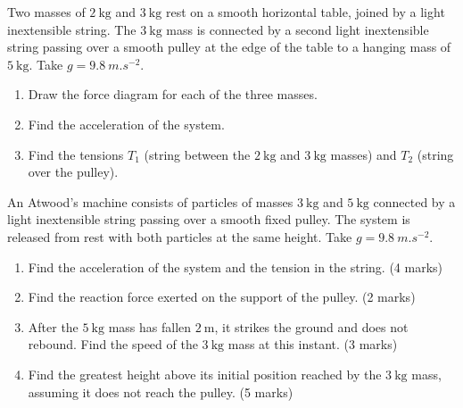 \documentclass[11pt]{article}
\newcounter{popsec}
\newcounter{popsub}
\newcommand{\courssub}[1]{%
  \stepcounter{popsub}%
  \par\vspace{9pt}\noindent{\popxbold\fontsize{11.5}{13}\selectfont\color{popink}{\color{poporange}\thepopsec.\thepopsub}\hspace{6pt}#1}\par\nopagebreak\vspace{4pt}
}
\begin{document}
\begin{exercice}
Two masses of $2\ \mathrm{kg}$ and $3\ \mathrm{kg}$ rest on a smooth horizontal table, joined by a light inextensible string. The $3\ \mathrm{kg}$ mass is connected by a second light inextensible string passing over a smooth pulley at the edge of the table to a hanging mass of $5\ \mathrm{kg}$. Take $g = \SI{9.8}{m.s^{-2}}$.
\begin{enumerate}
\item Draw the force diagram for each of the three masses.
\item Find the acceleration of the system.
\item Find the tensions $T_1$ (string between the $2\ \mathrm{kg}$ and $3\ \mathrm{kg}$ masses) and $T_2$ (string over the pulley).
\end{enumerate}
\end{exercice}

\courssub{I prepare for the GCE}

\begin{exercice}
An Atwood's machine consists of particles of masses $3\ \mathrm{kg}$ and $5\ \mathrm{kg}$ connected by a light inextensible string passing over a smooth fixed pulley. The system is released from rest with both particles at the same height. Take $g = \SI{9.8}{m.s^{-2}}$.
\begin{enumerate}
\item[(a)] Find the acceleration of the system and the tension in the string. \hfill (4 marks)
\item[(b)] Find the reaction force exerted on the support of the pulley. \hfill (2 marks)
\item[(c)] After the $5\ \mathrm{kg}$ mass has fallen $2\ \mathrm{m}$, it strikes the ground and does not rebound. Find the speed of the $3\ \mathrm{kg}$ mass at this instant. \hfill (3 marks)
\item[(d)] Find the greatest height above its initial position reached by the $3\ \mathrm{kg}$ mass, assuming it does not reach the pulley. \hfill (5 marks)
\end{enumerate}
\end{exercice}
\end{document}
